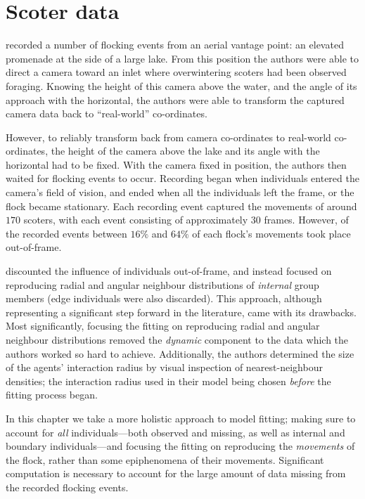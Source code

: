 \section{Scoter data}

\textcite{lukeman10} recorded a number of flocking events from an aerial
vantage point: an elevated promenade at the side of a large lake. From this
position the authors were able to direct a camera toward an inlet where
overwintering scoters had been observed foraging. Knowing the height of this
camera above the water, and the angle of its approach with the horizontal, the
authors were able to transform the captured camera data back to ``real-world''
co-ordinates.

However, to reliably transform back from camera co-ordinates to real-world
co-ordinates, the height of the camera above the lake and its angle with the
horizontal had to be fixed. With the camera fixed in position, the authors then
waited for flocking events to occur. Recording began when individuals entered
the camera's field of vision, and ended when all the individuals left the
frame, or the flock became stationary. Each recording event captured the
movements of around $170$ scoters, with each event consisting of approximately
$30$ frames. However, of the recorded events between $16\%$ and $64\%$ of each
flock's movements took place out-of-frame.

\textcite{lukeman10} discounted the influence of individuals out-of-frame, and
instead focused on reproducing radial and angular neighbour distributions of
\emph{internal} group members (edge individuals were also discarded). This
approach, although representing a significant step forward in the literature,
came with its drawbacks. Most significantly, focusing the fitting on
reproducing radial and angular neighbour distributions removed the
\emph{dynamic} component to the data which the authors worked so hard to
achieve. Additionally, the authors determined the size of the agents'
interaction radius by visual inspection of nearest-neighbour densities; the
interaction radius used in their model being chosen \emph{before} the fitting
process began.

In this chapter we take a more holistic approach to model fitting; making sure
to account for \emph{all} individuals---both observed and missing, as well as
internal and boundary individuals---and focusing the fitting on reproducing
the \emph{movements} of the flock, rather than some epiphenomena of their
movements. Significant computation is necessary to account for the large amount
of data missing from the recorded flocking events.

